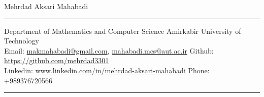 
\begin{center}
\begin{large} 
Mehrdad Aksari Mahabadi 
\rule{\linewidth}{0.4pt}
\end{large}
Department of Mathematics and Computer Science Amirkabir University of Technology \\
Email: \href{mailto:makmahabadi@gmail.com}{makmahabadi@gmail.com}, \href{mailto:mahabadi.mcs@aut.ac.ir}{mahabadi.mcs@aut.ac.ir}
Github: \href{https://github.com/mehrdad3301}{https://github.com/mehrdad3301} \\
Linkedin: \href{https://www.linkedin.com/in/mehrdad-aksari-mahabadi}{www.linkedin.com/in/mehrdad-aksari-mahabadi} 
Phone: +989376720566 \\ 
\rule{\linewidth}{0.4pt}
\end{center}